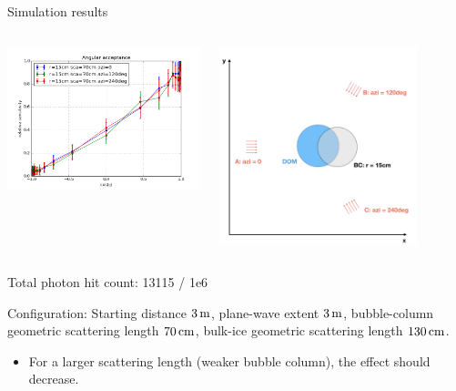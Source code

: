 \begin{frame}[fragile]{Simulation results}
  \begin{columns}
    \begin{column}{0.5\textwidth}
      \includegraphics[width=\textwidth]{img/summer_scenario_r15cm_sca70cm}
    \end{column}
    \begin{column}{0.5\textwidth}
      \includegraphics[width=0.8\textwidth]{img/summerscenario-004}
    \end{column}
  \end{columns}

  \tiny Total photon hit count: 13115 / 1e6

  \tiny Configuration: Starting distance $3\text{\,m}$, plane-wave extent $3\text{\,m}$, bubble-column geometric scattering length $70\text{\,cm}$, bulk-ice geometric scattering length $130\text{\,cm}$.
  \normalsize

  \begin{itemize}
    \item For a larger scattering length (weaker bubble column), the effect should decrease. \checkmark
  \end{itemize}
\end{frame}

